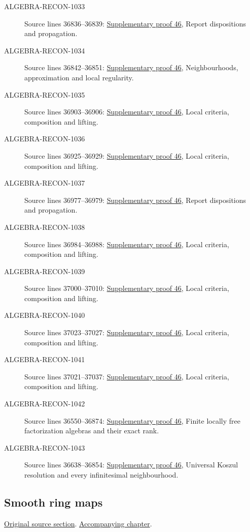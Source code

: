 \begin{description}
\item[ALGEBRA-RECON-1033] Source lines 36836--36839: \hyperlink{algebra_syntomic_notes_20260928}{Supplementary proof 46}, Report dispositions and propagation.
\item[ALGEBRA-RECON-1034] Source lines 36842--36851: \hyperlink{algebra_syntomic_notes_20260928}{Supplementary proof 46}, Neighbourhoods, approximation and local regularity.
\item[ALGEBRA-RECON-1035] Source lines 36903--36906: \hyperlink{algebra_syntomic_notes_20260928}{Supplementary proof 46}, Local criteria, composition and lifting.
\item[ALGEBRA-RECON-1036] Source lines 36925--36929: \hyperlink{algebra_syntomic_notes_20260928}{Supplementary proof 46}, Local criteria, composition and lifting.
\item[ALGEBRA-RECON-1037] Source lines 36977--36979: \hyperlink{algebra_syntomic_notes_20260928}{Supplementary proof 46}, Report dispositions and propagation.
\item[ALGEBRA-RECON-1038] Source lines 36984--36988: \hyperlink{algebra_syntomic_notes_20260928}{Supplementary proof 46}, Local criteria, composition and lifting.
\item[ALGEBRA-RECON-1039] Source lines 37000--37010: \hyperlink{algebra_syntomic_notes_20260928}{Supplementary proof 46}, Local criteria, composition and lifting.
\item[ALGEBRA-RECON-1040] Source lines 37023--37027: \hyperlink{algebra_syntomic_notes_20260928}{Supplementary proof 46}, Local criteria, composition and lifting.
\item[ALGEBRA-RECON-1041] Source lines 37021--37037: \hyperlink{algebra_syntomic_notes_20260928}{Supplementary proof 46}, Local criteria, composition and lifting.
\item[ALGEBRA-RECON-1042] Source lines 36550--36874: \hyperlink{algebra_syntomic_notes_20260928}{Supplementary proof 46}, Finite locally free factorization algebras and their exact rank.
\item[ALGEBRA-RECON-1043] Source lines 36638--36854: \hyperlink{algebra_syntomic_notes_20260928}{Supplementary proof 46}, Universal Koszul resolution and every infinitesimal neighbourhood.
\end{description}

\subsection{Smooth ring maps}
\hypertarget{algebra-source-section-smooth}{}
\noindent\href{https://github.com/stacks/stacks-project/blob/a04446e57ec1fbc252a871afcec7752fb2807b14/algebra.tex\#L37055}{Original source section}. \href{algebra.pdf\#nameddest=section-smooth}{Accompanying chapter}.

